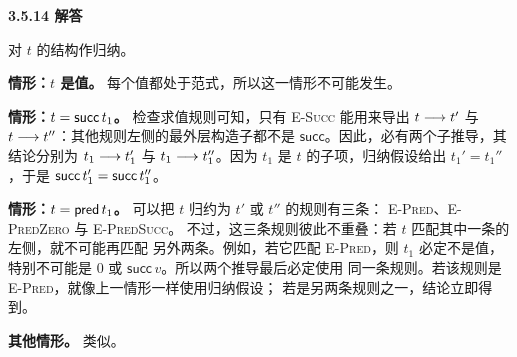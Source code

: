 \begin{taplauthorsolutionentrybox}
\label{sol:author:3.5.14}
\textbf{3.5.14 解答}

对 \(t\) 的结构作归纳。

\medskip\noindent
\textbf{情形：\(t\) 是值。}
每个值都处于范式，所以这一情形不可能发生。

\medskip\noindent
\textbf{情形：\(t=\mathsf{succ}\,t_1\)。}
检查求值规则可知，只有 \textsc{E-Succ} 能用来导出
\(t\mathrel{\longrightarrow} t'\) 与 \(t\mathrel{\longrightarrow} t''\)：其他规则左侧的最外层构造子都不是
\(\mathsf{succ}\)。因此，必有两个子推导，其结论分别为
\(t_1\mathrel{\longrightarrow} t_1'\) 与 \(t_1\mathrel{\longrightarrow} t_1''\)。因为 \(t_1\) 是 \(t\)
的子项，归纳假设给出 \(t_1'=t_1''\)，于是
\(\mathsf{succ}\,t_1'=\mathsf{succ}\,t_1''\)。

\medskip\noindent
\textbf{情形：\(t=\mathsf{pred}\,t_1\)。}
可以把 \(t\) 归约为 \(t'\) 或 \(t''\) 的规则有三条：
\textsc{E-Pred}、\textsc{E-PredZero} 与 \textsc{E-PredSucc}。
不过，这三条规则彼此不重叠：若 \(t\) 匹配其中一条的左侧，就不可能再匹配
另外两条。例如，若它匹配 \textsc{E-Pred}，则 \(t_1\) 必定不是值，
特别不可能是 \(0\) 或 \(\mathsf{succ}\,v\)。所以两个推导最后必定使用
同一条规则。若该规则是 \textsc{E-Pred}，就像上一情形一样使用归纳假设；
若是另两条规则之一，结论立即得到。

\medskip\noindent
\textbf{其他情形。}
类似。

\end{taplauthorsolutionentrybox}


